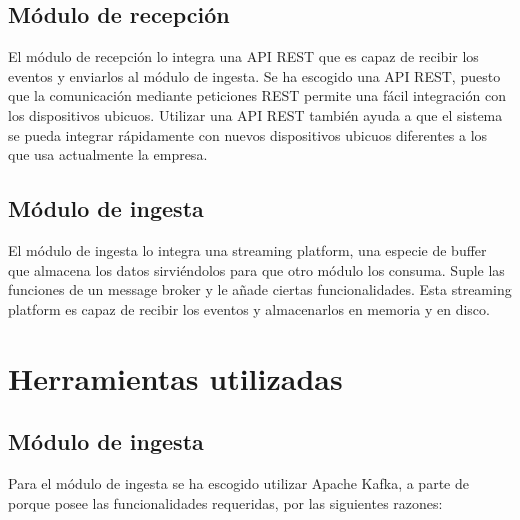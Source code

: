 \subsection{Módulo de recepción}
El módulo de recepción lo integra una API REST que es capaz de recibir los eventos y enviarlos al módulo de ingesta. Se ha escogido una API REST, puesto que la comunicación mediante peticiones REST permite una fácil integración con los dispositivos ubicuos. Utilizar una API REST también ayuda a que el sistema se pueda integrar rápidamente con nuevos dispositivos ubicuos diferentes a los que usa actualmente la empresa.

\subsection{Módulo de ingesta}
El módulo de ingesta lo integra una streaming platform, una especie de buffer que almacena los datos sirviéndolos para que otro módulo los consuma. Suple las funciones de un message broker\cite{Tfg:messagebroker} y le añade ciertas funcionalidades. Esta streaming platform es capaz de recibir los eventos y almacenarlos en memoria y en disco.


\section{Herramientas utilizadas}

\subsection{Módulo de ingesta}
Para el módulo de ingesta se ha escogido utilizar Apache Kafka\cite{Tfg:kafka}, a parte de porque posee las funcionalidades requeridas, por las siguientes razones:

